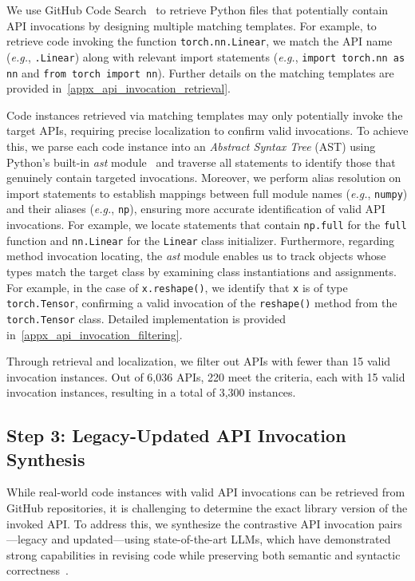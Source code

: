 We use GitHub Code Search~\cite{github_code_search} to retrieve Python files that potentially contain API invocations by designing multiple matching templates. For example, to retrieve code invoking the function \texttt{torch.nn.Linear}, we match the API name (\emph{e.g.}, \texttt{.Linear}) along with relevant import statements (\emph{e.g.}, \texttt{import torch.nn as nn} and \texttt{from torch import nn}). Further details on the matching templates are provided in~\cref{appx_api_invocation_retrieval}.

Code instances retrieved via matching templates may only potentially invoke the target APIs, requiring precise localization to confirm valid invocations. To achieve this, we parse each code instance into an \textit{Abstract Syntax Tree} (AST) using Python's built-in \textit{ast} module~\cite{python_ast} and traverse all statements to identify those that genuinely contain targeted invocations. Moreover, we perform alias resolution on import statements to establish mappings between full module names (\emph{e.g.}, \texttt{numpy}) and their aliases (\emph{e.g.}, \texttt{np}), ensuring more accurate identification of valid API invocations. For example, we locate statements that contain \texttt{np.full} for the \texttt{full} function and \texttt{nn.Linear} for the \texttt{Linear} class initializer. Furthermore, regarding method invocation locating, the \textit{ast} module enables us to track objects whose types match the target class by examining class instantiations and assignments. For example, in the case of \texttt{x.reshape()}, we identify that \texttt{x} is of type \texttt{torch.Tensor}, confirming a valid invocation of the \texttt{reshape()} method from the \texttt{torch.Tensor} class. Detailed implementation is provided in~\cref{appx_api_invocation_filtering}.

Through retrieval and localization, we filter out APIs with fewer than 15 valid invocation instances. Out of 6,036 APIs, 220 meet the criteria, each with 15 valid invocation instances, resulting in a total of 3,300 instances.


\subsection{Step 3: Legacy-Updated API Invocation Synthesis}
\label{sec_step3}
While real-world code instances with valid API invocations can be retrieved from GitHub repositories, it is challenging to determine the exact library version of the invoked API. To address this, we synthesize the contrastive API invocation pairs—legacy and updated—using state-of-the-art LLMs, which have demonstrated strong capabilities in revising code while preserving both semantic and syntactic correctness~\cite{guo2024code_refinement}.

